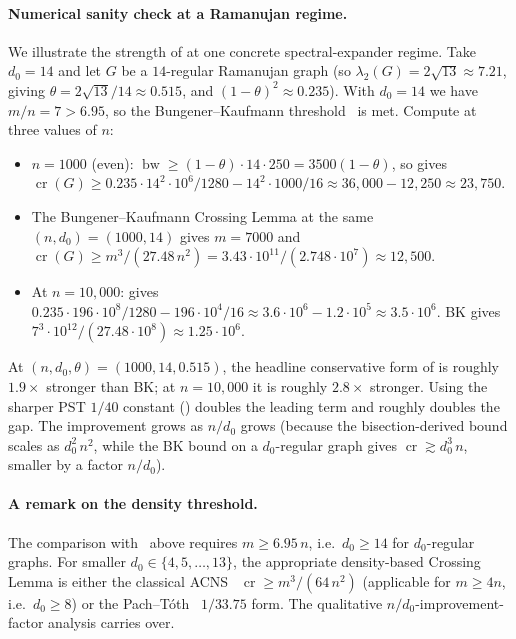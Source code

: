 \documentclass[11pt,a4paper]{article}
\theoremstyle{definition}
\DeclareMathOperator{\crN}{cr}
\DeclareMathOperator{\bw}{bw}
\begin{document}
\paragraph{Numerical sanity check at a Ramanujan regime.}
We illustrate the strength of  at one concrete
spectral-expander regime. Take $d_0 = 14$ and let $G$ be a
$14$-regular Ramanujan graph (so $\lambda_2(G) = 2\sqrt{13}
\approx 7.21$, giving $\theta = 2\sqrt{13}/14 \approx 0.515$, and
$(1 - \theta)^{2} \approx 0.235$). With $d_0 = 14$ we have
$m/n = 7 > 6.95$, so the Bungener--Kaufmann
threshold~\cite{BK24} is met. Compute at three values of $n$:
\begin{itemize}
  \item $n = 1000$ (even): $\bw \ge (1-\theta) \cdot 14 \cdot 250 = 3500(1-\theta)$,
        so  gives
        $\crN(G) \ge 0.235 \cdot 14^{2} \cdot 10^{6} / 1280 - 14^{2}
        \cdot 1000 / 16 \approx 36{,}000 - 12{,}250 \approx 23{,}750$.
  \item The Bungener--Kaufmann Crossing Lemma at the same
        $(n, d_0) = (1000, 14)$ gives $m = 7000$ and
        $\crN(G) \ge m^{3}/(27.48\,n^{2})
        = 3.43 \cdot 10^{11}/(2.748 \cdot 10^{7}) \approx 12{,}500$.
  \item At $n = 10{,}000$:  gives
        $0.235 \cdot 196 \cdot 10^{8}/1280 - 196 \cdot 10^{4}/16
        \approx 3.6 \cdot 10^{6} - 1.2 \cdot 10^{5}
        \approx 3.5 \cdot 10^{6}$.
        BK gives $7^{3} \cdot 10^{12}/(27.48 \cdot 10^{8})
        \approx 1.25 \cdot 10^{6}$.
\end{itemize}
At $(n, d_0, \theta) = (1000, 14, 0.515)$, the headline
conservative form of  is roughly $1.9\times$
stronger than BK; at $n = 10{,}000$ it is roughly $2.8\times$
stronger. Using the sharper PST $1/40$ constant
() doubles the leading term and roughly
doubles the gap. The improvement grows as $n / d_0$ grows
(because the bisection-derived bound scales as $d_0^{2}\,n^{2}$,
while the BK bound on a $d_0$-regular graph gives
$\crN \gtrsim d_0^{3}\,n$, smaller by a factor $n / d_0$).

\paragraph{A remark on the density threshold.}
The comparison with~\cite{BK24} above requires $m \ge 6.95\,n$,
i.e.\ $d_0 \ge 14$ for $d_0$-regular graphs. For smaller
$d_0 \in \{4, 5, \dots, 13\}$, the appropriate density-based
Crossing Lemma is either the classical
ACNS~\cite{ACNS,Leighton83} $\crN \ge m^{3}/(64\,n^{2})$
(applicable for $m \ge 4 n$, i.e.\ $d_0 \ge 8$) or the
Pach--T\'oth~\cite{PachToth97} $1/33.75$ form. The qualitative
$n/d_0$-improvement-factor analysis carries over.
\end{document}
